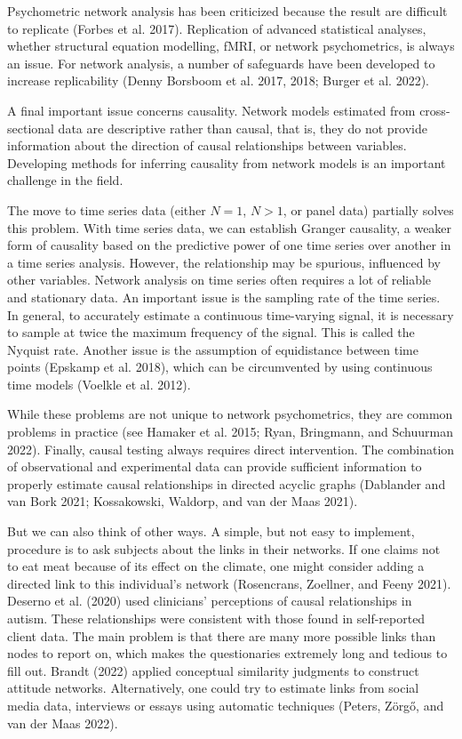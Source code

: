 \documentclass[
  a4paper,
  DIV=11,
  numbers=noendperiod,
  oneside]{scrreprt}
\begin{document}
Psychometric network analysis has been criticized because the result are
difficult to replicate (Forbes et al. 2017). Replication of advanced
statistical analyses, whether structural equation modelling, fMRI, or
network psychometrics, is always an issue. For network analysis, a
number of safeguards have been developed to increase replicability
(Denny Borsboom et al. 2017, 2018; Burger et al. 2022).

A final important issue concerns causality. Network models estimated
from cross-sectional data are descriptive rather than causal, that is,
they do not provide information about the direction of causal
relationships between variables. Developing methods for inferring
causality from network models is an important challenge in the field.

The move to time series data (either \(N=1\), \(N>1\), or panel data)
partially solves this problem. With time series data, we can establish
Granger causality, a weaker form of causality based on the predictive
power of one time series over another in a time series analysis.
However, the relationship may be spurious, influenced by other
variables. Network analysis on time series often requires a lot of
reliable and stationary data. An important issue is the sampling rate of
the time series. In general, to accurately estimate a continuous
time-varying signal, it is necessary to sample at twice the maximum
frequency of the signal. This is called the Nyquist rate. Another issue
is the assumption of equidistance between time points (Epskamp et al.
2018), which can be circumvented by using continuous time models
(Voelkle et al. 2012).

While these problems are not unique to network psychometrics, they are
common problems in practice (see Hamaker et al. 2015; Ryan, Bringmann,
and Schuurman 2022). Finally, causal testing always requires direct
intervention. The combination of observational and experimental data can
provide sufficient information to properly estimate causal relationships
in directed acyclic graphs (Dablander and van Bork 2021; Kossakowski,
Waldorp, and van der Maas 2021).

But we can also think of other ways. A simple, but not easy to
implement, procedure is to ask subjects about the links in their
networks. If one claims not to eat meat because of its effect on the
climate, one might consider adding a directed link to this individual's
network (Rosencrans, Zoellner, and Feeny 2021). Deserno et al. (2020)
used clinicians' perceptions of causal relationships in autism. These
relationships were consistent with those found in self-reported client
data. The main problem is that there are many more possible links than
nodes to report on, which makes the questionaries extremely long and
tedious to fill out. Brandt (2022) applied conceptual similarity
judgments to construct attitude networks. Alternatively, one could try
to estimate links from social media data, interviews or essays using
automatic techniques (Peters, Zörgő, and van der Maas 2022).
\end{document}

